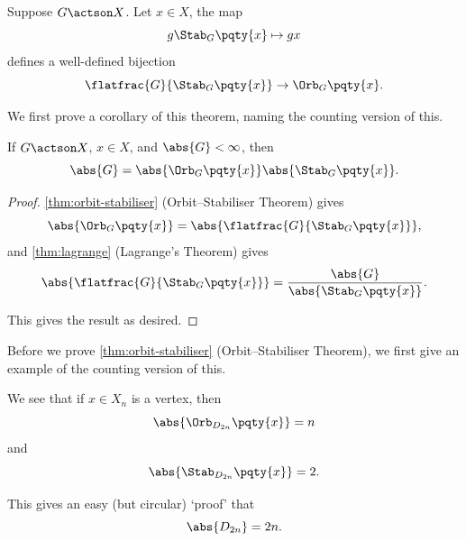 \begin{theorem}
    \label{thm:orbit-stabiliser}%
    Suppose \(G \actson X\). Let \(x \in X\), the map
    \[
        g \Stab_{G}\pqty{x} \mapsto gx
    \]
    defines a well-defined bijection
    \[
        \flatfrac{G}{\Stab_{G}\pqty{x}} \to \Orb_{G}\pqty{x}.
    \]
\end{theorem}

We first prove a corollary of this theorem, naming the counting version of this.

\begin{corollary}
    \label{cor:orbit-stabiliser}%
    If \(G \actson X\), \(x \in X\), and \(\abs{G}<\infty\), then
    \[
        \abs{G} = \abs{\Orb_{G}\pqty{x}} \abs{\Stab_{G}\pqty{x}}.
    \]
\end{corollary}

\begin{proof}
    \autoref{thm:orbit-stabiliser} (Orbit--Stabiliser Theorem) gives
    \[
        \abs{\Orb_{G} \pqty{x}} = \abs{\flatfrac{G}{\Stab_{G}\pqty{x}}},
    \]
    and \autoref{thm:lagrange} (Lagrange's Theorem) gives
    \[
        \abs{\flatfrac{G}{\Stab_{G} \pqty{x}}} = \frac{\abs{G}}{\abs{\Stab_{G} \pqty{x}}}.
    \]

    This gives the result as desired.
\end{proof}

Before we prove \autoref{thm:orbit-stabiliser} (Orbit--Stabiliser Theorem), we first give an example of the counting version of this.

\begin{example*}[\(D_{2n} \actson X_n\)]
    We see that if \(x \in X_n\) is a vertex, then
    \[
        \abs{\Orb_{D_{2n}} \pqty{x}} = n
    \]
    and
    \[
        \abs{\Stab_{D_{2n}} \pqty{x}} = 2.
    \]

    This gives an easy (but circular) `proof' that
    \[
        \abs{D_{2n}} = 2n.
    \]
\end{example*}

